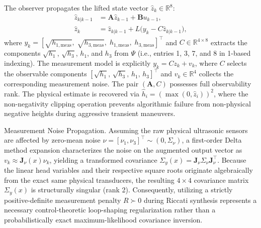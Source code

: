 \documentclass[asi,article,accept,pdftex,moreauthors]{Definitions/mdpi}
\begin{document}
The observer propagates the lifted state vector $\hat{z}_k \in \mathbb{R}^8$:
\begin{align}
\hat z_{k|k-1}&=\mathbf A\hat z_{k-1}+\mathbf Bu_{k-1},\label{eq:pred}\\
\hat z_k&=\hat z_{k|k-1}+L\bigl(y_k-C\hat z_{k|k-1}\bigr),\label{eq:corr}
\end{align}
where $y_k = [\sqrt{h_{1,\mathrm{meas}}},\;\sqrt{h_{3,\mathrm{meas}}},\;h_{1,\mathrm{meas}},\;h_{3,\mathrm{meas}}]^\top$
and $C \in \mathbb{R}^{4\times8}$ extracts the components 
$\sqrt{h_1}$, $\sqrt{h_3}$, $h_1$, and $h_3$ from $\Psi$ 
(i.e., entries 1, 3, 7, and 8 in 1-based indexing). {The measurement model is explicitly $y_k = C z_k + v_k$, where $C$ selects the observable components $[\sqrt{h_1},\,\sqrt{h_3},\,h_1,\,h_3]^\top$ and $v_k\in\mathbb R^4$ collects the corresponding measurement noise.} The pair $(\mathbf{A}, C)$ possesses full observability rank. The physical estimate is recovered via $\hat h_i=(\max(0,\hat z_i))^2$, where the non-negativity clipping operation prevents algorithmic failure from non-physical negative heights during aggressive transient maneuvers.

{Measurement Noise Propagation. Assuming the raw physical ultrasonic sensors are affected by zero-mean noise $\nu=[\nu_1,\nu_3]^\top\sim(0,\Sigma_\nu)$, a first-order Delta method expansion characterizes the noise on the augmented output vector as $v_k\approx \mathbf J_\nu(x)\nu_k$, yielding a transformed covariance $\Sigma_y(x) = \mathbf J_\nu\Sigma_\nu\mathbf J_\nu^\top$. Because the linear head variables and their respective square roots originate algebraically from the exact same physical transducers, the resulting $4 \times 4$ covariance matrix $\Sigma_y(x)$ is structurally singular (rank 2). Consequently, utilizing a strictly positive-definite measurement penalty $R \succ 0$ during Riccati synthesis represents a necessary control-theoretic loop-shaping regularization rather than a probabilistically exact maximum-likelihood covariance inversion.}
\end{document}
